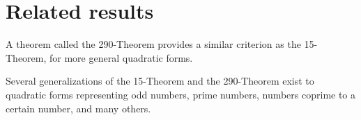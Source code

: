 \documentclass[letterpaper, 12pt]{article}
\begin{document}
\section{Related results}
A theorem called the 290-Theorem provides a similar criterion as the 15-Theorem, for more general quadratic forms.

Several generalizations of the 15-Theorem and the 290-Theorem exist to quadratic forms representing odd numbers, prime numbers, numbers coprime to a certain number, and many others.
\end{document}
